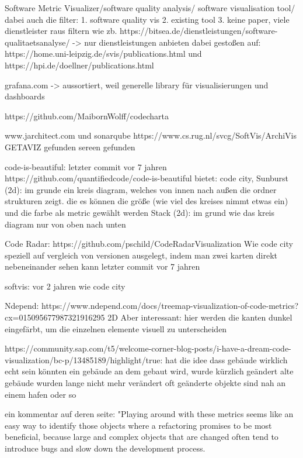 Software Metric Visualizer/software quality analysis/ software visualisation tool/ 
dabei auch die filter: 1. software quality vis 2. existing tool 3. keine paper, 
viele dienstleister raus filtern wie zb. https://bitsea.de/dienstleistungen/software-qualitaetsanalyse/ -> nur dienstleistungen anbieten
dabei gestoßen auf: https://home.uni-leipzig.de/svis/publications.html und https://hpi.de/doellner/publications.html


grafana.com -> aussortiert, weil generelle library für visualisierungen und dashboards


https://github.com/MaibornWolff/codecharta

www.jarchitect.com und sonarqube
https://www.cs.rug.nl/svcg/SoftVis/ArchiVis
GETAVIZ gefunden
sereen gefunden

code-is-beautiful: letzter commit vor 7 jahren
https://github.com/quantifiedcode/code-is-beautiful
bietet: code city, 
Sunburst (2d): im grunde ein kreis diagram, welches von  innen nach außen die ordner strukturen zeigt. die es können die größe (wie viel des kreises nimmt etwas ein) und die farbe als metric gewählt werden
Stack (2d): im grund wie das kreis diagram nur von oben nach unten


Code Radar:
https://github.com/pschild/CodeRadarVisualization
Wie code city speziell auf vergleich von versionen ausgelegt, indem man zwei karten direkt nebeneinander sehen kann
letzter commit vor 7 jahren


softvis:
vor 2 jahren
wie code city


Ndepend:
https://www.ndepend.com/docs/treemap-visualization-of-code-metrics?cx=015095677987321916295%
2D
Aber interessant: hier werden die kanten dunkel eingefärbt, um die einzelnen elemente visuell zu unterscheiden


https://community.sap.com/t5/welcome-corner-blog-posts/i-have-a-dream-code-visualization/bc-p/13485189/highlight/true:
hat die idee dass gebäude wirklich echt sein könnten
ein gebäude an dem gebaut wird, wurde kürzlich geändert
alte gebäude wurden lange nicht mehr verändert
oft geänderte objekte sind nah an einem hafen oder so

ein kommentar auf deren seite:
"Playing around with these metrics seems like an easy way to identify those objects where a refactoring promises to be most beneficial, because large and complex objects that are changed often tend to introduce bugs and slow down the development process.

